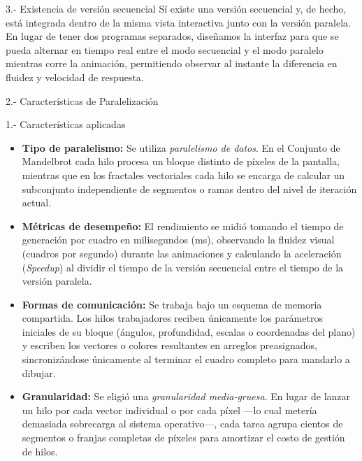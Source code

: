 \begin{respuesta}{3.- Existencia de versión secuencial}
    Sí existe una versión secuencial y, de hecho, está integrada dentro de la misma vista interactiva junto con la versión paralela. En lugar de tener dos programas separados, diseñamos la interfaz para que se pueda alternar en tiempo real entre el modo secuencial y el modo paralelo mientras corre la animación, permitiendo observar al instante la diferencia en fluidez y velocidad de respuesta.
\end{respuesta}

\begin{ejercicio}{2.- Características de Paralelización}
\end{ejercicio}

\begin{respuesta}{1.- Características aplicadas}
    \begin{itemize}
        \item \textbf{Tipo de paralelismo:} Se utiliza \textit{paralelismo de datos}. En el Conjunto de Mandelbrot cada hilo procesa un bloque distinto de píxeles de la pantalla, mientras que en los fractales vectoriales cada hilo se encarga de calcular un subconjunto independiente de segmentos o ramas dentro del nivel de iteración actual.
        
        \item \textbf{Métricas de desempeño:} El rendimiento se midió tomando el tiempo de generación por cuadro en milisegundos (ms), observando la fluidez visual (cuadros por segundo) durante las animaciones y calculando la aceleración (\textit{Speedup}) al dividir el tiempo de la versión secuencial entre el tiempo de la versión paralela.
        
        \item \textbf{Formas de comunicación:} Se trabaja bajo un esquema de memoria compartida. Los hilos trabajadores reciben únicamente los parámetros iniciales de su bloque (ángulos, profundidad, escalas o coordenadas del plano) y escriben los vectores o colores resultantes en arreglos preasignados, sincronizándose únicamente al terminar el cuadro completo para mandarlo a dibujar.
        
        \item \textbf{Granularidad:} Se eligió una \textit{granularidad media-gruesa}. En lugar de lanzar un hilo por cada vector individual o por cada píxel —lo cual metería demasiada sobrecarga al sistema operativo—, cada tarea agrupa cientos de segmentos o franjas completas de píxeles para amortizar el costo de gestión de hilos.
        

\end{itemize}
\end{respuesta}
